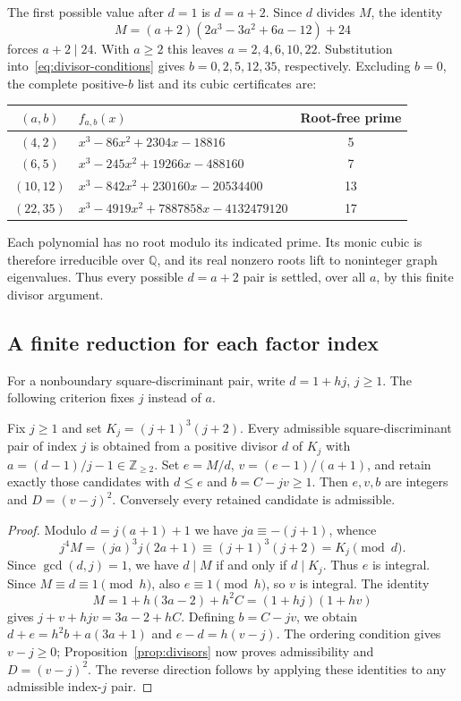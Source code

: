 The first possible value after $d=1$ is $d=a+2$.
Since $d$ divides $M$, the identity
\[
M=(a+2)(2a^3-3a^2+6a-12)+24
\]
forces $a+2\mid24$. With $a\geq2$ this leaves
$a=2,4,6,10,22$. Substitution into~\eqref{eq:divisor-conditions}
gives $b=0,2,5,12,35$, respectively. Excluding $b=0$, the complete
positive-$b$ list and its cubic certificates are:
\begin{center}
\begin{tabular}{clc}
\toprule
$(a,b)$ & $f_{a,b}(x)$ & Root-free prime\\
\midrule
$(4,2)$ & $x^3-86x^2+2304x-18816$ & 5\\
$(6,5)$ & $x^3-245x^2+19266x-488160$ & 7\\
$(10,12)$ & $x^3-842x^2+230160x-20534400$ & 13\\
$(22,35)$ & $x^3-4919x^2+7887858x-4132479120$ & 17\\
\bottomrule
\end{tabular}
\end{center}
Each polynomial has no root modulo its indicated prime. Its monic cubic
is therefore irreducible over $\mathbb Q$, and its real nonzero roots
lift to noninteger graph eigenvalues. Thus every possible $d=a+2$ pair
is settled, over all $a$, by this finite divisor argument.

\subsection{A finite reduction for each factor index}

For a nonboundary square-discriminant pair, write $d=1+hj$, $j\geq1$.
The following criterion fixes $j$ instead of $a$.

\begin{proposition}
\label{prop:index}
Fix $j\geq1$ and set $K_j=(j+1)^3(j+2)$.
Every admissible square-discriminant pair of index $j$ is obtained from
a positive divisor $d$ of $K_j$ with
$a=(d-1)/j-1\in\mathbb Z_{\geq2}$.
Set $e=M/d$, $v=(e-1)/(a+1)$, and retain exactly those candidates with
$d\leq e$ and $b=C-jv\geq1$. Then $e,v,b$ are integers and
$D=(v-j)^2$. Conversely every retained candidate is admissible.
\end{proposition}
\begin{proof}
Modulo $d=j(a+1)+1$ we have $ja\equiv-(j+1)$, whence
\[
j^4M=(ja)^3j(2a+1)\equiv(j+1)^3(j+2)=K_j\pmod d.
\]
Since $\gcd(d,j)=1$, we have $d\mid M$ if and only if $d\mid K_j$.
Thus $e$ is integral. Since $M\equiv d\equiv1\pmod h$, also
$e\equiv1\pmod h$, so $v$ is integral. The identity
\[
M=1+h(3a-2)+h^2C=(1+hj)(1+hv)
\]
gives $j+v+h jv=3a-2+hC$. Defining $b=C-jv$, we obtain
$d+e=h^2b+a(3a+1)$ and $e-d=h(v-j)$.
The ordering condition gives $v-j\geq0$; Proposition~\ref{prop:divisors}
now proves admissibility and $D=(v-j)^2$. The reverse direction follows
by applying these identities to any admissible index-$j$ pair.
\end{proof}

